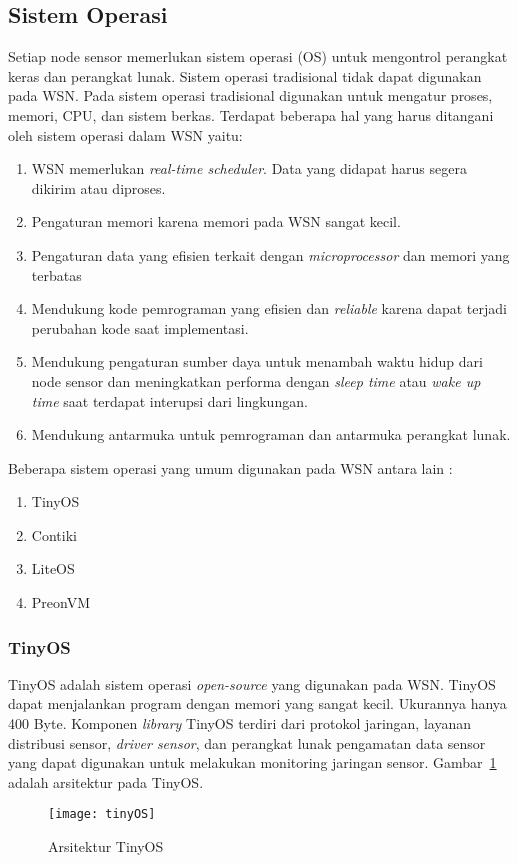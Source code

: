 \subsection{Sistem Operasi}
Setiap node sensor memerlukan sistem operasi (OS) untuk mengontrol perangkat keras dan perangkat lunak. Sistem operasi tradisional tidak dapat digunakan pada WSN. Pada sistem operasi tradisional digunakan untuk mengatur proses, memori, CPU, dan sistem berkas. Terdapat beberapa hal yang harus ditangani oleh sistem operasi dalam WSN yaitu:
\begin{enumerate}
	\item WSN memerlukan \textit{real-time scheduler}. Data yang didapat harus segera dikirim atau diproses.
	\item Pengaturan memori karena memori pada WSN sangat kecil.
	\item Pengaturan data yang efisien terkait dengan \textit{microprocessor} dan memori yang terbatas
	\item Mendukung kode pemrograman yang efisien dan \textit{reliable} karena dapat terjadi perubahan kode saat implementasi.
	\item Mendukung pengaturan sumber daya untuk menambah waktu hidup dari node sensor dan meningkatkan performa dengan \textit{sleep time} atau \textit{wake up time} saat terdapat interupsi dari lingkungan.
	\item Mendukung antarmuka untuk pemrograman dan antarmuka perangkat lunak. 
\end{enumerate}

Beberapa sistem operasi yang umum digunakan pada WSN antara lain :
\begin{enumerate}
	\item TinyOS
	\item Contiki
	\item LiteOS
	\item PreonVM
\end{enumerate}

\subsubsection{TinyOS}
TinyOS adalah sistem operasi \textit{open-source} yang digunakan pada WSN. TinyOS dapat menjalankan program dengan memori yang sangat kecil. Ukurannya hanya 400 Byte. Komponen \textit{library} TinyOS terdiri dari protokol jaringan, layanan distribusi sensor, \textit{driver sensor}, dan perangkat lunak pengamatan data sensor yang dapat digunakan untuk melakukan monitoring jaringan sensor. Gambar~\ref{fig:tinyOS} adalah arsitektur pada TinyOS. 
\begin{figure} [H]
	\centering  
	\texttt{[image: tinyOS]}  
	\caption[Arsitektur TinyOS]{Arsitektur TinyOS} 
	\label{fig:tinyOS} 
\end{figure}

